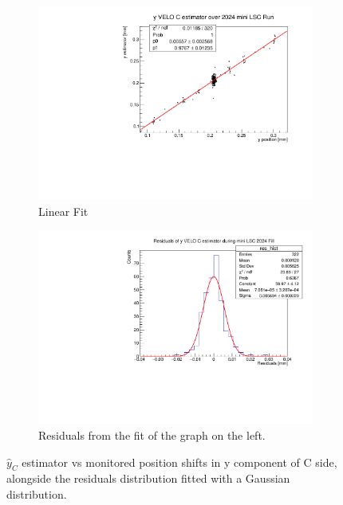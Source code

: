 \begin{figure}
    \centering
    \begin{subfigure}{0.48\textwidth}
    \includegraphics[width=\linewidth]{figures/yVeloC_fit_comparison.pdf}
    \caption{Linear Fit}\label{fig:yCfit_comparison}
    \end{subfigure}
    \begin{subfigure}{0.48\textwidth}
    \includegraphics[width=\linewidth]{figures/yVeloC_res_comparison.pdf}
    \caption{Residuals from the fit of the graph on the left. }\label{fig:yCres_comparison}
    \end{subfigure}
    \caption{$\hat{y}_{C}$ estimator vs monitored position shifts in y component of C side, alongside the residuals distribution fitted with a Gaussian distribution.}
    \label{fig:yC_comparison}
\end{figure}

